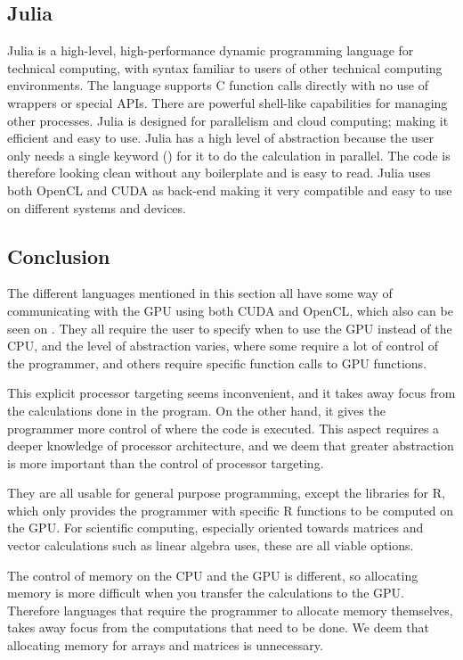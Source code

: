 \subsection{Julia}
Julia is a high-level, high-performance dynamic programming language for technical computing, with syntax familiar to users of other technical computing environments.
The language supports C function calls directly with no use of wrappers or special APIs.
There are powerful shell-like capabilities for managing other processes.
Julia is designed for parallelism and cloud computing; making it efficient and easy to use.
Julia has a high level of abstraction because the user only needs a single keyword (\@parallel) for it to do the calculation in parallel.
The code is therefore looking clean without any boilerplate and is easy to read.
Julia uses both OpenCL and CUDA as back-end making it very compatible and easy to use on different systems and devices.\citep{Julia_Git,Julia}

   

\subsection{Conclusion}  

The different languages mentioned in this section all have some way of communicating with the GPU using both CUDA and OpenCL, which also can be seen on  .
They all require the user to specify when to use the GPU instead of the CPU, and the level of abstraction varies, where some require a lot of control of the programmer, and others require specific function calls to GPU functions.

This explicit processor targeting seems inconvenient, and it takes away focus from the calculations done in the program.
On the other hand, it gives the programmer more control of where the code is executed.
This aspect requires a deeper knowledge of processor architecture, and we deem that greater abstraction is more important than the control of processor targeting.

They are all usable for general purpose programming, except the libraries for R, which only provides the programmer with specific R functions to be computed on the GPU.
For scientific computing, especially oriented towards matrices and vector calculations such as linear algebra uses, these are all viable options.

The control of memory on the CPU and the GPU is different, so allocating memory is more difficult when you transfer the calculations to the GPU.
Therefore languages that require the programmer to allocate memory themselves, takes away focus from the computations that need to be done.
We deem that allocating memory for arrays and matrices is unnecessary.
                     
